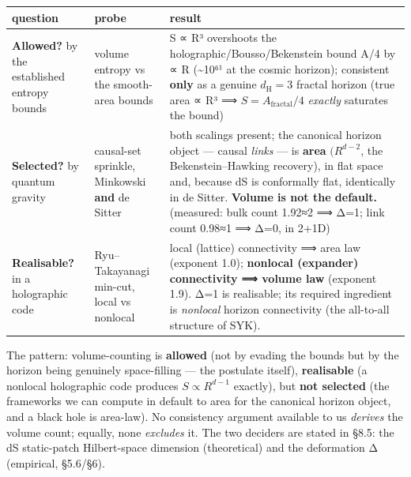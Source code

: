 \documentclass[
  10pt,
]{article}
\begin{document}
\begin{longtable}[]{@{}
  >{\raggedright\arraybackslash}p{}
  >{\raggedright\arraybackslash}p{}
  >{\raggedright\arraybackslash}p{}@{}}
\toprule\noalign{}
\begin{minipage}[b]{\linewidth}\raggedright
question
\end{minipage} & \begin{minipage}[b]{\linewidth}\raggedright
probe
\end{minipage} & \begin{minipage}[b]{\linewidth}\raggedright
result
\end{minipage} \\
\midrule\noalign{}
\endhead
\bottomrule\noalign{}
\endlastfoot
\textbf{Allowed?} by the established entropy bounds & volume entropy vs
the smooth-area bounds & S ∝ R³ overshoots the
holographic/Bousso/Bekenstein bound A/4 by ∝ R (\textasciitilde10⁶¹ at
the cosmic horizon); consistent \textbf{only} as a genuine
\(d_{\mathrm{H}}=3\) fractal horizon (true area ∝ R³ ⟹
\(S = A_{\mathrm{fractal}}/4\) \emph{exactly} saturates the bound) \\
\textbf{Selected?} by quantum gravity & causal-set sprinkle, Minkowski
\textbf{and} de Sitter & both scalings present; the canonical horizon
object --- causal \emph{links} --- is \textbf{area} \((R^{d-2}\), the
Bekenstein--Hawking recovery), in flat space and, because dS is
conformally flat, identically in de Sitter. \textbf{Volume is not the
default.} (measured: bulk count 1.92≈2 ⟹ Δ=1; link count 0.98≈1 ⟹ Δ=0,
in 2+1D) \\
\textbf{Realisable?} in a holographic code & Ryu--Takayanagi min-cut,
local vs nonlocal & local (lattice) connectivity ⟹ area law (exponent
1.0); \textbf{nonlocal (expander) connectivity ⟹ volume law} (exponent
1.9). Δ=1 is realisable; its required ingredient is \emph{nonlocal}
horizon connectivity (the all-to-all structure of SYK). \\
\end{longtable}

The pattern: volume-counting is \textbf{allowed} (not by evading the
bounds but by the horizon being genuinely space-filling --- the
postulate itself), \textbf{realisable} (a nonlocal holographic code
produces \(S \propto  R^{d-1}\) exactly), but \textbf{not selected} (the
frameworks we can compute in default to area for the canonical horizon
object, and a black hole is area-law). No consistency argument available
to us \emph{derives} the volume count; equally, none \emph{excludes} it.
The two deciders are stated in §8.5: the dS static-patch Hilbert-space
dimension (theoretical) and the deformation Δ (empirical, §5.6/§6).
\end{document}
